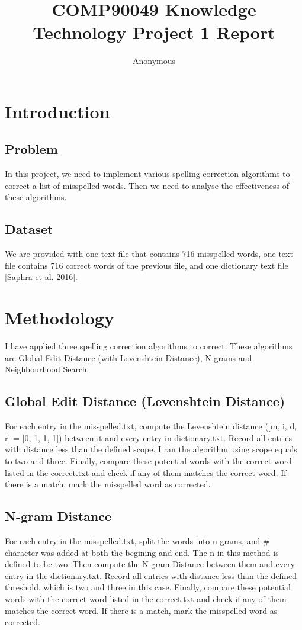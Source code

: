 \documentclass[11pt]{article}
\title{COMP90049 Knowledge Technology Project 1 Report}
\author{Anonymous}
\begin{document}
\maketitle

\section{Introduction}
  \subsection{Problem}
  In this project, we need to implement various spelling correction algorithms
  to correct a list of misspelled words. Then we need to analyse the
  effectiveness of these algorithms.
  \subsection{Dataset}
  We are provided with one text file that contains 716
  misspelled words, one text file contains 716 correct words of the previous
  file, and one dictionary text file [Saphra et al. 2016].

\section{Methodology}
I have applied three spelling correction algorithms to correct.
These algorithms are Global Edit Distance (with Levenshtein Distance),
N-grams and Neighbourhood Search.

  \subsection{Global Edit Distance (Levenshtein Distance)}
  For each entry in the misspelled.txt, compute the Levenshtein distance
  ([m, i, d, r] = [0, 1, 1, 1]) between
  it and every entry in dictionary.txt. Record all entries with distance
  less than the defined scope. I ran the algorithm using scope equals to two
  and three. Finally, compare these potential
  words with the correct word listed in the correct.txt and check if any of them
  matches the correct word. If there is a match, mark the misspelled word as
  corrected.

  \subsection{N-gram Distance}
  For each entry in the misspelled.txt, split the words into n-grams, and $\#$ character
  was added at both the begining and end. The n in this method is defined to be two.
  Then compute the N-gram Distance between them and every entry in the
  dictionary.txt. Record all entries with distance less than the defined threshold,
  which is two and three in this case.
  Finally, compare these potential words with the correct word listed in
  the correct.txt and check if any of them matches the correct word.
  If there is a match, mark the misspelled word as corrected.
\end{document}
